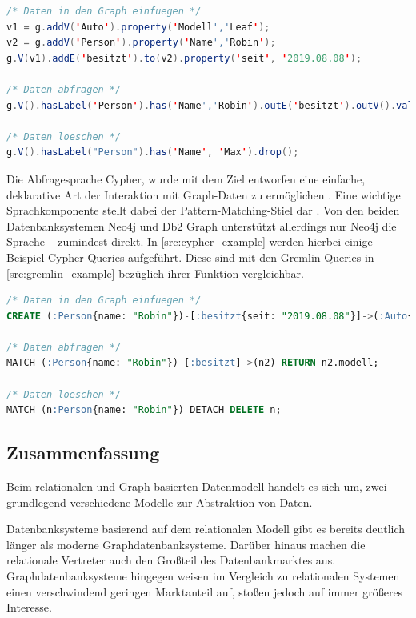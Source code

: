 \begin{lstlisting}[caption={Beispiel Gremlin-Queries},language=JAVA,label=src:gremlin_example]
/* Daten in den Graph einfuegen */
v1 = g.addV('Auto').property('Modell','Leaf');
v2 = g.addV('Person').property('Name','Robin');
g.V(v1).addE('besitzt').to(v2).property('seit', '2019.08.08');

/* Daten abfragen */
g.V().hasLabel('Person').has('Name','Robin').outE('besitzt').outV().values('Modell')

/* Daten loeschen */
g.V().hasLabel("Person").has('Name', 'Max').drop();
\end{lstlisting}

Die Abfragesprache Cypher, wurde mit dem Ziel entworfen eine einfache, deklarative Art der Interaktion mit Graph-Daten zu ermöglichen \cite{gdbms}. Eine wichtige Sprachkomponente stellt dabei der Pattern-Matching-Stiel dar \cite{gdbms}. Von den beiden Datenbanksystemen Neo4j und Db2 Graph unterstützt allerdings nur Neo4j die Sprache -- zumindest direkt. In \autoref{src:cypher_example} werden hierbei einige Beispiel-Cypher-Queries aufgeführt. Diese sind mit den Gremlin-Queries in \autoref{src:gremlin_example} bezüglich ihrer Funktion vergleichbar. 

\begin{lstlisting}[caption={Beispiel Cypher-Queries},language=SQL,label=src:cypher_example]
/* Daten in den Graph einfuegen */
CREATE (:Person{name: "Robin"})-[:besitzt{seit: "2019.08.08"}]->(:Auto{modell: "Leaf"});

/* Daten abfragen */
MATCH (:Person{name: "Robin"})-[:besitzt]->(n2) RETURN n2.modell;

/* Daten loeschen */
MATCH (n:Person{name: "Robin"}) DETACH DELETE n;
\end{lstlisting}

\subsection{Zusammenfassung}

Beim relationalen und Graph-basierten Datenmodell handelt es sich um, zwei grundlegend verschiedene Modelle zur Abstraktion von Daten.

Datenbanksysteme basierend auf dem relationalen Modell gibt es bereits deutlich länger als moderne Graphdatenbanksysteme. Darüber hinaus machen die relationale Vertreter auch den Großteil des Datenbankmarktes aus. Graphdatenbanksysteme hingegen weisen im Vergleich zu relationalen Systemen einen verschwindend geringen Marktanteil auf, stoßen jedoch auf immer größeres Interesse. 


